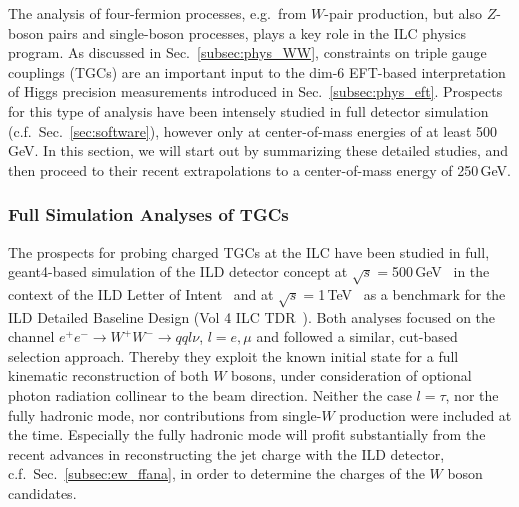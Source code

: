 
The analysis of four-fermion processes, e.g.\ from $W$-pair production, but also 
 $Z$-boson pairs and single-boson processes, plays a key role in the ILC physics program.  As discussed in Sec.~\ref{subsec:phys_WW}, constraints on triple gauge couplings (TGCs) are an important input to the dim-6 EFT-based interpretation of Higgs precision measurements introduced in Sec.~\ref{subsec:phys_eft}. Prospects for this type of analysis have been intensely studied in full detector simulation (c.f.\ Sec.~\ref{sec:software}), however only at center-of-mass energies of at least 500\,GeV. In this section, we will start out by summarizing these detailed studies, and then proceed to their recent extrapolations to a center-of-mass energy of 250\,GeV.


\subsubsection{Full Simulation Analyses of TGCs}
\label{subsubsec:ew_fullsimww}
The prospects for probing charged TGCs at the ILC have been studied in full, geant4-based simulation of the ILD detector concept at $\sqrt{s}=$500\,GeV~\cite{Marchesini:94888} in the context of the ILD Letter of Intent~\cite{Abe:2010aa} and at $\sqrt{s}=$1\,TeV~\cite{Rosca:2016hcq} as a benchmark for the ILD Detailed Baseline Design (Vol 4 ILC TDR~\cite{Behnke:2013lya}). Both analyses focused on the channel $e^+e^- \to W^+ W^- \to qql\nu$, $l=e, \mu$ and followed a similar, cut-based selection approach. Thereby they exploit the known initial state for a full kinematic reconstruction of both $W$ bosons, under consideration of optional photon radiation collinear to the beam direction.
Neither the case $l=\tau$, nor the fully hadronic mode, nor contributions from single-$W$ production were included at the time. Especially the fully hadronic mode will profit substantially from the recent advances in reconstructing the jet charge with the ILD detector, c.f.\ Sec.~\ref{subsec:ew_ffana}, in order to determine the charges of the $W$ boson candidates.

